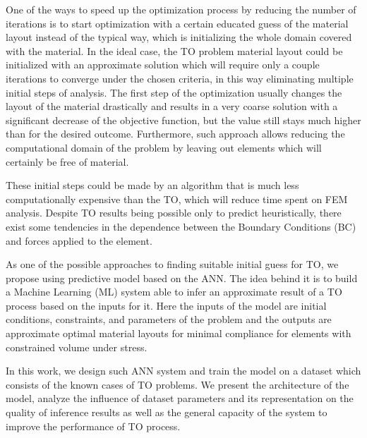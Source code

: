 One of the ways to speed up the optimization process by reducing the number of iterations is to start optimization with a certain educated guess of the material layout instead of the typical way, which is initializing the whole domain covered with the material.
In the ideal case, the TO problem material layout could be initialized with an approximate solution which will require only a couple iterations to converge under the chosen criteria, in this way eliminating multiple initial steps of analysis.
The first step of the optimization usually changes the layout of the material drastically and results in a very coarse solution with a significant decrease of the objective function, but the value still stays much higher than for the desired outcome. 
Furthermore, such approach allows reducing the computational domain of the problem by leaving out elements which will certainly be free of material.
\medskip
{}

These initial steps could be made by an algorithm that is much less computationally expensive than the TO, which will reduce time spent on FEM analysis. 
Despite TO results being possible only to predict heuristically, there exist some tendencies in the dependence between the Boundary Conditions (BC) and forces applied to the element. 
\medskip

As one of the possible approaches to finding suitable initial guess for TO, we propose using predictive model based on the ANN.
The idea behind it is to build a Machine Learning (ML) system able to infer an approximate result of a TO process based on the inputs for it.
Here the inputs of the model are initial conditions, constraints, and parameters of the problem and the outputs are approximate optimal material layouts for minimal compliance for elements with constrained volume under stress.
\medskip

In this work, we design such ANN system and train the model on a dataset which consists of the known cases of TO problems. 
We present the architecture of the model, analyze the influence of dataset parameters and its representation on the quality of inference results as well as the general capacity of the system to improve the performance of TO process.  
\medskip

